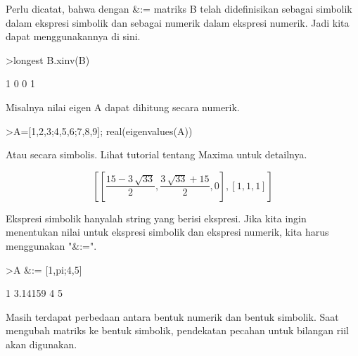 \documentclass[a4paper,10pt]{article}
\begin{document}
\begin{eulernotebook}
\begin{eulercomment}
\begin{eulercomment}
\begin{eulercomment}
\begin{eulercomment}
\begin{eulercomment}
\begin{eulercomment}
\begin{eulercomment}
Perlu dicatat, bahwa dengan \&:= matriks B telah didefinisikan sebagai
simbolik dalam ekspresi simbolik dan sebagai numerik dalam ekspresi
numerik. Jadi kita dapat menggunakannya di sini.
\end{eulercomment}
\begin{eulerprompt}
>longest B.xinv(B)
\end{eulerprompt}
\begin{euleroutput}
                        1                       0 
                        0                       1 
\end{euleroutput}
\begin{eulercomment}
Misalnya nilai eigen A dapat dihitung secara numerik.
\end{eulercomment}
\begin{eulerprompt}
>A=[1,2,3;4,5,6;7,8,9]; real(eigenvalues(A))
\end{eulerprompt}
\begin{euleroutput}
  [16.1168,  -1.11684,  0]
\end{euleroutput}
\begin{eulercomment}
Atau secara simbolis. Lihat tutorial tentang Maxima untuk detailnya.
\end{eulercomment}
\begin{eulerformula}
\[
\left[ \left[ \frac{15-3\,\sqrt{33}}{2} , \frac{3\,\sqrt{33}+15}{2}
  , 0 \right]  , \left[ 1 , 1 , 1 \right]  \right] 
\]
\end{eulerformula}
\begin{eulercomment}
Ekspresi simbolik hanyalah string yang berisi ekspresi. Jika kita
ingin menentukan nilai untuk ekspresi simbolik dan ekspresi numerik,
kita harus menggunakan "\&:=".
\end{eulercomment}
\begin{eulerprompt}
>A &:= [1,pi;4,5]
\end{eulerprompt}
\begin{euleroutput}
              1       3.14159 
              4             5 
\end{euleroutput}
\begin{eulercomment}
Masih terdapat perbedaan antara bentuk numerik dan bentuk simbolik.
Saat mengubah matriks ke bentuk simbolik, pendekatan pecahan untuk
bilangan riil akan digunakan.
\end{eulercomment}
\begin{eulerprompt}

\end{eulerprompt}
\end{eulercomment}
\end{eulercomment}
\end{eulercomment}
\end{eulercomment}
\end{eulercomment}
\end{eulercomment}
\end{eulernotebook}
\end{document}
